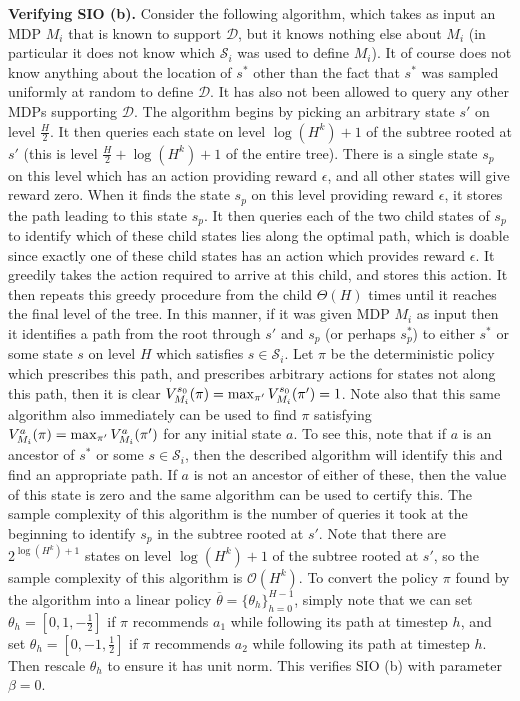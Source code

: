 \documentclass[11pt,twoside]{article}
\begin{document}
\noindent \textbf{Verifying SIO (b).} Consider the following algorithm, which takes as input an MDP $M_i$ that is known to support $\mathcal{D}$, but it knows nothing else about $M_i$ (in particular it does not know which $\mathcal{S}_i$ was used to define $M_i$). It of course does not know anything about the location of $s^*$ other than the fact that $s^*$ was sampled uniformly at random to define $\mathcal{D}$. It has also not been allowed to query any other MDPs supporting $\mathcal{D}$. The algorithm begins by picking an arbitrary state $s'$ on level $\frac{H}{2}$. It then queries each state on level $\log(H^k) + 1$ of the subtree rooted at $s'$ (this is level $\frac{H}{2} + \log(H^k) + 1$ of the entire tree). There is a single state $s_p$ on this level which has an action providing reward $\epsilon$, and all other states will give reward zero. When it finds the state $s_p$ on this level providing reward $\epsilon$, it stores the path leading to this state $s_p$. It then queries each of the two child states of $s_p$ to identify which of these child states lies along the optimal path, which is doable since exactly one of these child states has an action which provides reward $\epsilon$. It greedily takes the action required to arrive at this child, and stores this action. It then repeats this greedy procedure from the child $\Theta(H)$ times until it reaches the final level of the tree. In this manner, if it was given MDP $M_i$ as input then it identifies a path from the root through $s'$ and $s_p$ (or perhaps $s^*_p$) to either $s^*$ or some state $s$ on level $H$ which satisfies $s \in \mathcal{S}_i$. Let $\pi$ be the deterministic policy which prescribes this path, and prescribes arbitrary actions for states not along this path, then it is clear $V^{{s_0 }}_{{M_i }}({\pi}) = \max_{\pi'} V^{{s_0 }}_{{M_i }}({\pi'}) = 1$. Note also that this same algorithm also immediately can be used to find $\pi$ satisfying $V^{{a }}_{{M_i }}({\pi}) = \max_{\pi'} V^{{a }}_{{M_i }}({\pi'})$ for any initial state $a$. To see this, note that if $a$ is an ancestor of $s^*$ or some $s \in \mathcal{S}_i$, then the described algorithm will identify this and find an appropriate path. If $a$ is not an ancestor of either of these, then the value of this state is zero and the same algorithm can be used to certify this. The sample complexity of this algorithm is the number of queries it took at the beginning to identify $s_p$ in the subtree rooted at $s'$. Note that there are $2^{\log(H^k) + 1}$ states on level $\log(H^k) + 1$ of the subtree rooted at $s'$, so the sample complexity of this algorithm is $\mathcal{O}(H^k)$. To convert the policy $\pi$ found by the algorithm into a linear policy $\overline{\theta} = \{ \theta_h \}_{h=0}^{H-1}$, simply note that we can set $\theta_h = [0, 1, - \frac{1}{2}]$ if $\pi$ recommends $a_1$ while following its path at timestep $h$, and set $\theta_h = [0, -1, \frac{1}{2}]$ if $\pi$ recommends $a_2$ while following its path at timestep $h$. Then rescale $\theta_h$ to ensure it has unit norm. This verifies SIO (b) with parameter $\beta = 0$. \\
\end{document}
